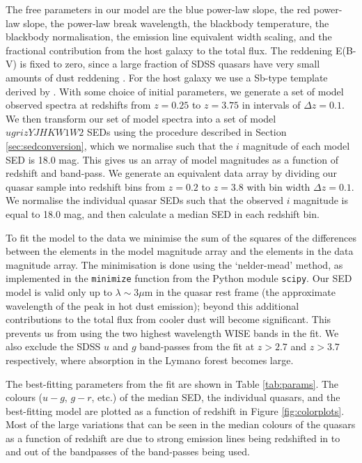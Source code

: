 The free parameters in our model are the blue power-law slope, the red power-law slope, the power-law break wavelength, the blackbody temperature, the blackbody normalisation, the emission line equivalent width scaling, and the fractional contribution from the host galaxy to the total flux. 
The reddening E(B-V) is fixed to zero, since a large fraction of SDSS quasars have very small amounts of dust reddening \citep{richards03}. 
For the host galaxy we use a Sb-type template derived by \citet{mannucci01}. 
With some choice of initial parameters, we generate a set of model observed spectra at redshifts from $z=0.25$ to $z=3.75$ in intervals of $\Delta z = 0.1$. 
We then transform our set of model spectra into a set of model $ugrizYJHKW1W2$ SEDs using the procedure described in Section \ref{sec:sedconversion}, which we normalise such that the $i$ magnitude of each model SED is 18.0 mag. This gives us an array of model magnitudes as a function of redshift and band-pass. 
We generate an equivalent data array by dividing our quasar sample into redshift bins from $z=0.2$ to $z=3.8$ with bin width $\Delta z = 0.1$. 
We normalise the individual quasar SEDs such that the observed $i$ magnitude is equal to 18.0 mag, and then calculate a median SED in each redshift bin. 

To fit the model to the data we minimise the sum of the squares of the differences between the elements in the model magnitude array and the elements in the data magnitude array. 
The minimisation is done using the `nelder-mead' method, as implemented in the {\tt minimize} function from the Python module {\tt scipy}. 
Our SED model is valid only up to $\lambda \sim 3\mu$m in the quasar rest frame (the approximate wavelength of the peak in hot dust emission); beyond this additional contributions to the total flux from cooler dust will become significant. 
This prevents us from using the two highest wavelength WISE bands in the fit. 
We also exclude the SDSS $u$ and $g$ band-passes from the fit at $z > 2.7$ and $z > 3.7$ respectively, where absorption in the Lyman$\alpha$ forest becomes large. 

The best-fitting parameters from the fit are shown in Table \ref{tab:params}. 
The colours ($u - g$, $g - r$, etc.) of the median SED, the individual quasars, and the best-fitting model are plotted as a function of redshift in Figure \ref{fig:colorplots}.  
Most of the large variations that can be seen in the median colours of the quasars as a function of redshift are due to strong emission lines being redshifted in to and out of the bandpasses of the band-passes being used. 

